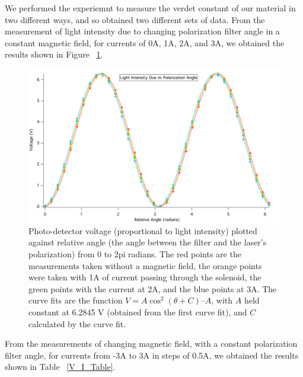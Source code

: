 \documentclass[prb,preprint]{revtex4-1}
\begin{document}
We performed the experiemnt to measure the verdet constant of our material in two different ways, and so obtained two different sets of data.  From the measurement of light intensity due to changing polarization filter angle in a constant magnetic field, for currents of 0A, 1A, 2A, and 3A, we obtained the results shown in Figure ~\ref{V_ThetaRel_Plot}. 

\begin{figure}[h!]
\centering
\includegraphics[width=6in]{V_ThetaRel_Plot.pdf}
\caption{Photo-detector voltage (proportional to light intensity) plotted against relative angle (the angle between the filter and the laser’s polarization) from 0 to 2pi radians.  The red points are the measurements taken without a magnetic field, the orange points were taken with 1A of current passing through the solenoid, the green points with the current at 2A, and the blue points at 3A.  The curve fits are the function $V = A \cos^{2}(\theta + C) – A$, with $A$ held constant at 6.2845 V (obtained from the first curve fit), and $C$ calculated by the curve fit. }
\label{V_ThetaRel_Plot}
\end{figure}

From the measurements of changing magnetic field, with a constant polarization filter angle, for currents from -3A to 3A in steps of 0.5A, we obtained the results shown in Table ~\ref{V_I_Table}. 
\end{document}
